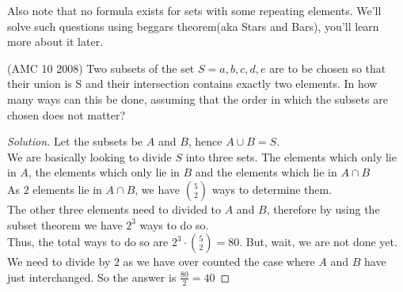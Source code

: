 Also note that no formula exists for sets with some repeating elements. We'll solve such questions using beggars theorem(aka Stars and Bars), you'll learn more about it later.
\begin{example}
    (AMC 10 2008) Two subsets of the set $S = {a, b, c, d, e}$ are to be chosen so that their union is S and their intersection contains exactly two elements. In how many ways can this be done, assuming that the order in which the subsets are chosen does not matter?
\end{example}
\begin{proof}
    [Solution]
    Let the subsets be $A$ and $B$, hence $A \cup B = S$.\\
    We are basically looking to divide $S$ into three sets. The elements which only lie in $A$, the elements which only lie in $B$ and the elements which lie in $A \cap B$\\
    As $2$ elements lie in $A \cap B$, we have $\binom{5}{2}$ ways to determine them.\\
    The other three elements need to divided to $A$ and $B$, therefore by using the subset theorem we have $2^3$ ways to do so.\\
    Thus, the total ways to do so are $2^3 \cdot \binom{5}{2}=80$. But, wait, we are not done yet. We need to divide by $2$ as we have over counted the case where $A$ and $B$ have just interchanged. So the answer is $\frac{80}{2}=\boxed{40}$
\end{proof}

